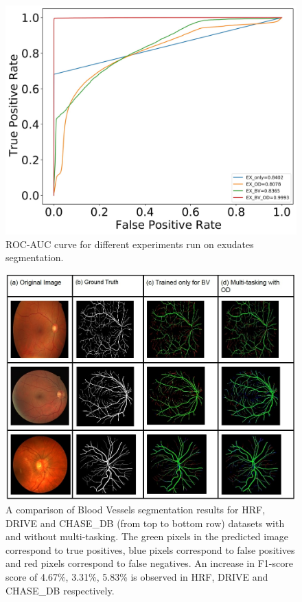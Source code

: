 \documentclass[utf8]{FrontiersinHarvard} %
\begin{document}
\begin{figure}
\begin{center}
\includegraphics[width=14cm]{images/roc_auc_exudates.jpg}%
\end{center}
\caption{ROC-AUC curve for different experiments run on exudates segmentation. }
\label{fig:roc_auc_exudates}
\end{figure}

\begin{figure}
\begin{center}
\includegraphics[width=14cm]{images/bv_results.jpg}%
\end{center}
\caption{A comparison of Blood Vessels segmentation results for HRF, DRIVE and CHASE\_DB (from top to bottom row) datasets with and without multi-tasking. The green pixels in the predicted image correspond to true positives, blue pixels correspond to false positives and  red pixels correspond to false negatives. An increase in F1-score score of 4.67\%,  3.31\%, 5.83\% is observed in HRF, DRIVE and CHASE\_DB respectively.}
\label{fig:bv_segmentation_results}
\end{figure}
\end{document}
